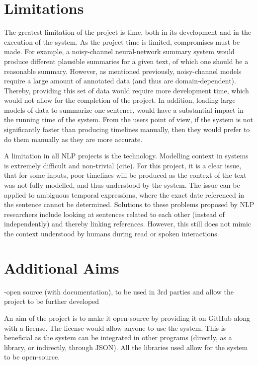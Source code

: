 \section{Limitations}
\par The greatest limitation of the project is time, both in its development and in the execution of the system. As the project time is limited, compromises must be made. For example, a noisy-channel neural-network summary system would produce different plausible summaries for a given text, of which one should be a reasonable summary. However, as mentioned previously, noisy-channel models require a large amount of annotated data (and thus are domain-dependent). Thereby, providing this set of data would require more development time, which would not allow for the completion of the project. In addition, loading large models of data to summarize one sentence, would have a substantial impact in the running time of the system. From the users point of view, if the system is not significantly faster than producing timelines manually, then they would prefer to do them manually as they are more accurate.

\par A limitation in all NLP projects is the technology. Modelling context in systems is extremely difficult and non-trivial (cite). For this project, it is a clear issue, that for some inputs, poor timelines will be produced as the context of the text was not fully modelled, and thus understood by the system. The issue can be applied to ambiguous temporal expressions, where the exact date referenced in the sentence cannot be determined. Solutions to these problems proposed by NLP researchers include looking at sentences related to each other (instead of independently) and thereby linking references. However, this still does not mimic the context understood by humans during read or spoken interactions.

\section{Additional Aims} 
-open source (with documentation), to be used in 3rd parties and allow the project to be further developed
\par An aim of the project is to make it open-source by providing it on GitHub along with a license. The license would allow anyone to use the system. This is beneficial as the system can be integrated in other programs (directly, as a library, or indirectly, through JSON). All the libraries used allow for the system to be open-source.

